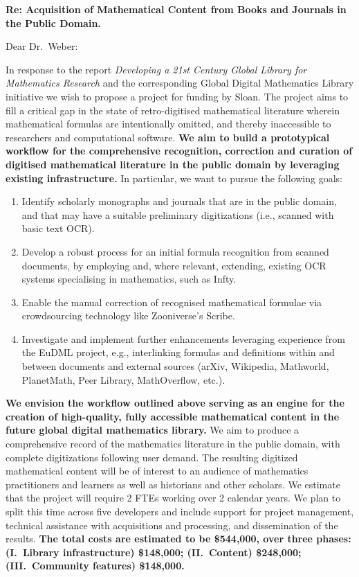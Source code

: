 \documentclass[10pt,letterpaper]{article}
\begin{document}
\thispagestyle{empty}

\noindent\textbf{Re: \quad Acquisition of Mathematical Content from Books and Journals in the Public Domain.}

\bigskip

\noindent Dear Dr.~Weber:

\bigskip

In response to the report \emph{Developing a 21st Century Global
  Library for Mathematics Research} and the corresponding Global
Digital Mathematics Library initiative we wish to propose a project
for funding by Sloan.  The project aims to fill a critical gap in the
state of retro-digitised mathematical literature wherein mathematical
formulas are intentionally omitted, and thereby inaccessible to
researchers and computational software.  \textbf{We aim to build a
  prototypical workflow for the comprehensive recognition, correction
  and curation of digitised mathematical literature in the public
  domain by leveraging existing infrastructure.} In particular, we
want to pursue the following goals:
\begin{enumerate}
\item Identify scholarly monographs and journals that are in the
  public domain, and that may have a suitable preliminary
  digitizations (i.e., scanned with basic text OCR).
\item Develop a robust process for an initial formula recognition from scanned 
documents, by employing and, where relevant, extending, existing OCR systems 
specialising in mathematics, such as {\sf Infty}.
\item Enable 
the manual correction of recognised mathematical formulae via crowdsourcing 
technology like Zooniverse's {\sf Scribe}.
\item Investigate and implement further enhancements leveraging
  experience from the EuDML project, e.g., interlinking formulas and
  definitions within and between documents and external sources
  (arXiv, Wikipedia, Mathworld, PlanetMath, Peer Library, MathOverflow, etc.).
\end{enumerate}
\textbf{We envision the workflow outlined above serving as an engine
  for the creation of high-quality, fully accessible mathematical
  content in the future global digital mathematics library.}  We aim
to produce a comprehensive record of the mathematics literature in the
public domain, with complete digitizations following user demand.  The
resulting digitized mathematical content will be of interest to an
audience of mathematics practitioners and learners as well as
historians and other scholars.  We estimate that the project will
require 2 FTEs working over 2 calendar years.
We plan to split this time across five developers and include support
for project management, technical assistance with acquisitions and
processing, and dissemination of the results.  \textbf{The total costs
  are estimated to be \$544,000, over three phases: (I.~Library
  infrastructure) \$148,000; (II.~Content) \$248,000; (III.~Community
  features) \$148,000.}
\end{document}
